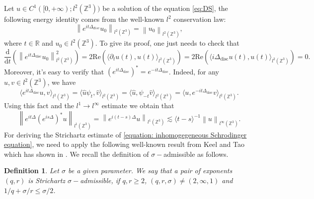 \documentclass[12pt]{amsart}
\newtheorem{definition}{Definition}[section]
\newcommand\JP[1]{\langle#1\rangle}
\newcommand\norm[1]{\left\|#1\right\|}
\newcommand\Inpro[3]{\langle #1,#2\rangle_{#3}}
\newcommand\RE{\text{Re}}
\newcommand{\R}{\mathbb{R}}
\newcommand{\Z}{\mathbb{Z}}
\def\d{\mathrm{d}}
\begin{document}
 Let $u\in C^1([0,+\infty);l^2(\mathbb{Z}^3))$ be a solution of the equation \ref{eq:DS},  the following energy identity comes from the well-known $l^2$ conservation law:
 \begin{equation*}
		\norm{e^{it\Delta_{disc}}u_{0}}_{l^{2}\left(\Z^{3}\right)}=\norm{u_{0}}_{l^{2}\left(\Z^{3}\right)},
	\end{equation*}
	where $t\in\R$ and $u_{0}\in l^{2}\left(\Z^{3}\right)$. To give its proof, one just needs to check that
	\begin{equation*}
		\frac{\d}{\d t}\left(\norm{e^{it\Delta_{\mathrm{disc}}}u_{0}}_{l^{2}\left(\Z^{3}\right)}^{2}\right)=2\RE\left(\Inpro{\partial_{t}u\left(t\right)}{u\left(t\right)}{l^{2}\left(\Z^{3}\right)}\right)=2\RE\left(\Inpro{i\Delta_{\mathrm{disc}}u\left(t\right)}{u\left(t\right)}{l^{2}\left(\Z^{3}\right)}\right)=0.
	\end{equation*}
	Moreover, it's easy to verify that $\left(e^{it\Delta_{\mathrm{disc}}}\right)^{*}=e^{-it\Delta_{\mathrm{disc}}}$. Indeed, for any $u,v\in l^{2}\left(\Z^{3}\right)$, we have
	\begin{equation*}
		\Inpro{e^{it\Delta_{\mathrm{disc}}}u}{v}{l^{2}\left(\Z^{3}\right)}=\Inpro{\widehat{u}\psi_{t}}{\widehat{v}}{l^{2}\left(\Z^{3}\right)}=\Inpro{\widehat{u}}{\psi_{-t}\widehat{v}}{l^{2}\left(\Z^{3}\right)}=\Inpro{u}{e^{-it\Delta_{\mathrm{disc}}}v}{l^{2}\left(\Z^{3}\right)}.
	\end{equation*}
	Using this fact and the $l^{1}\to l^{\infty}$ estimate we obtain that
	\begin{equation*}
		\norm{e^{it\Delta}\left(e^{is\Delta}\right)^{*}u}_{l^{1}\left(\Z^{3}\right)}=\norm{e^{i\left(t-s\right)\Delta}u}_{l^{1}\left(\Z^{3}\right)}\lesssim\JP{t-s}^{-1}\norm{u}_{l^{\infty}\left(\Z^{3}\right)}.
	\end{equation*}
	For deriving the Strichartz estimate of \eqref{equation: inhomogegeneous Schrodinger equation}, we need to apply the following well-known result from Keel and Tao which has shown in \cite{KT98}. We recall the definition of $\sigma-$admissible as follows.
	\begin{definition}
		Let $\sigma$ be a given parameter. We say that a pair of exponents $\left(q,r\right)$ is Strichartz $\sigma-$admissible, if $q,r\ge 2$, $\left(q,r,\sigma\right)\neq\left(2,\infty,1\right)$ and $1/q+\sigma/r\leq \sigma/2$.
	\end{definition}
\end{document}
